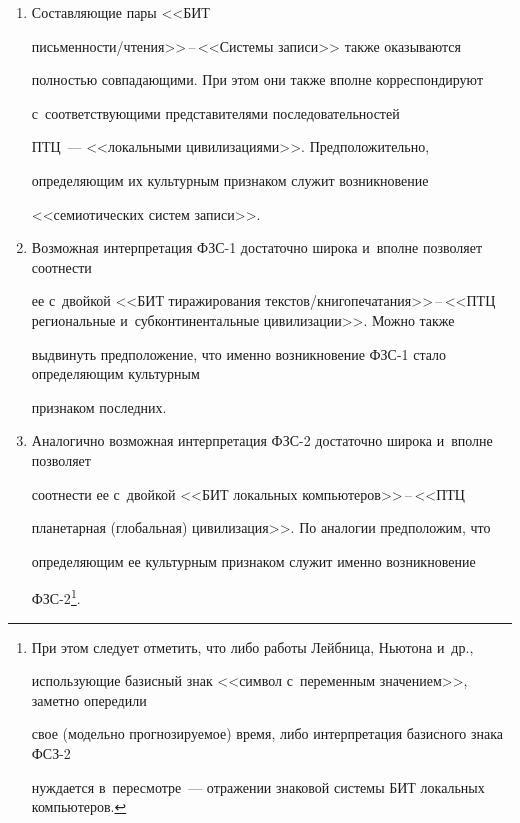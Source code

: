 \begin{enumerate}[1.]
\begin{table}
\begin{center}
\begin{tabular}{|c|p{22mm}|p{30mm}|p{35mm}|c|p{22mm}|}
\end{tabular}


\end{center}


\end{table}





  \item Составляющие пары <<БИТ  


пись\-мен\-ности\!/\!чте\-ния>>\,--\,<<Сис\-те\-мы записи>> также оказываются 


полностью совпадающими. При этом они также вполне корреспондируют 


с~соответствующими представителями последовательностей  


ПТЦ~--- <<ло\-каль\-ны\-ми цивилизациями>>. Предположительно, 


определяющим их культурным признаком служит возникновение 


<<семиотических сис\-тем записи>>.


  \item Возможная интерпретация ФЗС-1 достаточно широка и~вполне позволяет соотнести 


ее с~двойкой <<БИТ тиражирования текс\-тов\!/\!кни\-го\-пе\-ча\-та\-ния>>\,--\,<<ПТЦ региональные и~субконтинентальные цивилизации>>. Можно также 


выдвинуть предположение, что именно возникновение ФЗС-1 стало определяющим культурным 


признаком последних.


  \item Аналогично возможная интерпретация ФЗС-2 достаточно широка и~вполне позволяет 


соотнести ее с~двойкой <<БИТ локальных компьютеров>>\,--\,<<ПТЦ 


планетарная (глобальная) цивилизация>>. По аналогии предположим, что 


определяющим ее культурным признаком служит именно возникновение  


ФЗС-2\footnote{При этом следует отметить, что либо работы Лейбница, Ньютона и~др., 


использующие базисный знак <<символ с~переменным значением>>, заметно опередили 


свое (модельно прогнозируемое) время, либо интерпретация базисного знака ФСЗ-2 


нуждается в~пересмотре~--- отражении знаковой сис\-те\-мы БИТ локальных компьютеров.}. 



\end{enumerate}
